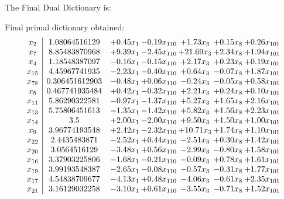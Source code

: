 \documentclass[8pt]{article}
\begin{document}
The Final Dual Dictionary is: 

 Final primal dictionary obtained: 
\[\begin{array}{c| c c@{\hskip 2pt} c@{\hskip 2pt} c@{\hskip 2pt} c@{\hskip 2pt} c@{\hskip 2pt} }
 x_{2}   &  1.08064516129 & +  0.45 x_{1} & -0.19 x_{110} & +  1.73 x_{3} & +  0.15 x_{8} & +  0.26 x_{101}\\
 x_{7}   &  8.85483870968 & +  9.39 x_{1} & -2.45 x_{110} & + 21.69 x_{3} & +  2.34 x_{8} & +  1.94 x_{101}\\
 x_{4}   &  1.18548387097 & -0.16 x_{1} & -0.15 x_{110} & +  2.17 x_{3} & +  0.23 x_{8} & +  0.19 x_{101}\\
 x_{15}   &  4.45967741935 & -2.23 x_{1} & -0.40 x_{110} & +  0.64 x_{3} & -0.07 x_{8} & +  1.87 x_{101}\\
 x_{78}   &  0.306451612903 & -0.48 x_{1} & +  0.06 x_{110} & -0.24 x_{3} & -0.05 x_{8} & +  0.58 x_{101}\\
 x_{5}   &  0.467741935484 & +  0.42 x_{1} & -0.32 x_{110} & +  2.21 x_{3} & +  0.24 x_{8} & +  0.10 x_{101}\\
 x_{11}   &  5.86290322581 & -0.97 x_{1} & -1.37 x_{110} & +  5.27 x_{3} & +  1.65 x_{8} & +  2.16 x_{101}\\
 x_{13}   &  5.75806451613 & -1.35 x_{1} & -1.42 x_{110} & +  5.82 x_{3} & +  1.56 x_{8} & +  2.23 x_{101}\\
 x_{14}   &  3.5 & +  2.00 x_{1} & -2.00 x_{110} & +  9.50 x_{3} & +  1.50 x_{8} & +  1.00 x_{101}\\
 x_{9}   &  3.96774193548 & +  2.42 x_{1} & -2.32 x_{110} & + 10.71 x_{3} & +  1.74 x_{8} & +  1.10 x_{101}\\
 x_{22}   &  2.4435483871 & -2.52 x_{1} & +  0.44 x_{110} & -2.51 x_{3} & +  0.30 x_{8} & +  1.42 x_{101}\\
 x_{20}   &  3.0564516129 & -3.48 x_{1} & +  0.56 x_{110} & -2.99 x_{3} & -0.80 x_{8} & +  1.58 x_{101}\\
 x_{16}   &  3.37903225806 & -1.68 x_{1} & -0.21 x_{110} & -0.09 x_{3} & +  0.78 x_{8} & +  1.61 x_{101}\\
 x_{19}   &  3.99193548387 & -2.65 x_{1} & -0.08 x_{110} & -0.57 x_{3} & -0.31 x_{8} & +  1.77 x_{101}\\
 x_{17}   &  4.54838709677 & -4.13 x_{1} & +  0.48 x_{110} & -4.06 x_{3} & -0.61 x_{8} & +  2.35 x_{101}\\
 x_{21}   &  3.16129032258 & -3.10 x_{1} & +  0.61 x_{110} & -3.55 x_{3} & -0.71 x_{8} & +  1.52 x_{101}\\

\end{array}\]
\end{document}
